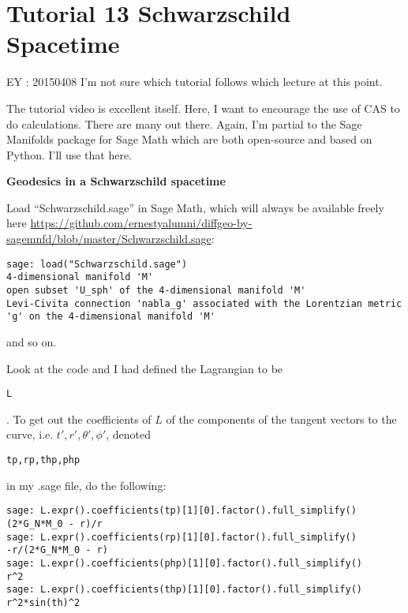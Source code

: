 \section*{Tutorial 13 Schwarzschild Spacetime}

EY : 20150408 I'm not sure which tutorial follows which lecture at this point.

The tutorial video is excellent itself.  Here, I want to encourage the use of CAS to do calculations.  There are many out there.  Again, I'm partial to the Sage Manifolds package for Sage Math which are both open-source and based on Python. I'll use that here.  

 \textbf{Geodesics in a Schwarzschild spacetime}


Load ``Schwarzschild.sage'' in Sage Math, which will always be available freely here \url{https://github.com/ernestyalumni/diffgeo-by-sagemnfd/blob/master/Schwarzschild.sage}:

{\scriptsize
\begin{verbatim}
sage: load("Schwarzschild.sage")
4-dimensional manifold 'M'
open subset 'U_sph' of the 4-dimensional manifold 'M'
Levi-Civita connection 'nabla_g' associated with the Lorentzian metric 'g' on the 4-dimensional manifold 'M'
\end{verbatim}}
and so on.

Look at the code and I had defined the Lagrangian to be \begin{verbatim}L\end{verbatim}.  To get out the coefficients of $L$ of the components of the tangent vectors to the curve, i.e. $t', r',\theta',\phi'$, denoted \begin{verbatim}tp,rp,thp,php\end{verbatim} in my .sage file, do the following:

\begin{verbatim}
sage: L.expr().coefficients(tp)[1][0].factor().full_simplify()
(2*G_N*M_0 - r)/r
sage: L.expr().coefficients(rp)[1][0].factor().full_simplify()
-r/(2*G_N*M_0 - r)
sage: L.expr().coefficients(php)[1][0].factor().full_simplify()
r^2
sage: L.expr().coefficients(thp)[1][0].factor().full_simplify()
r^2*sin(th)^2
\end{verbatim}


